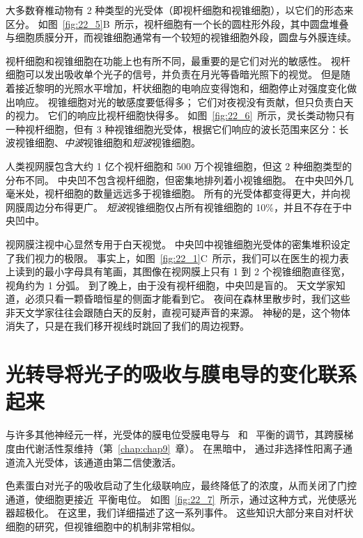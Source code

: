 大多数脊椎动物有 2 种类型的光受体（即视杆细胞和视锥细胞），以它们的形态来区分。
如图~\ref{fig:22_5}B~所示，视杆细胞有一个长的圆柱形外段，其中圆盘堆叠与细胞质膜分开，而视锥细胞通常有一个较短的视锥细胞外段，圆盘与外膜连续。


视杆细胞和视锥细胞在功能上也有所不同，最重要的是它们对光的敏感性。
视杆细胞可以发出吸收单个光子的信号，并负责在月光等昏暗光照下的视觉。
但是随着接近黎明的光照水平增加，杆状细胞的电响应变得饱和，细胞停止对强度变化做出响应。
视锥细胞对光的敏感度要低得多；
它们对夜视没有贡献，但只负责白天的视力。
它们的响应比视杆细胞快得多。
如图~\ref{fig:22_6}~所示，灵长类动物只有一种视杆细胞，但有 3 种视锥细胞光受体，根据它们响应的波长范围来区分：长波视锥细胞、\textit{中波}视锥细胞和\textit{短波}视锥细胞。


人类视网膜包含大约 1 亿个视杆细胞和 500 万个视锥细胞，但这 2 种细胞类型的分布不同。
中央凹不包含视杆细胞，但密集地排列着小视锥细胞。
在中央凹外几毫米处，视杆细胞的数量远远多于视锥细胞。
所有的光受体都变得更大，并向视网膜周边分布得更广。
\textit{短波}视锥细胞仅占所有视锥细胞的 10\%，并且不存在于中央凹中。


视网膜注视中心显然专用于白天视觉。
中央凹中视锥细胞光受体的密集堆积设定了我们视力的极限。
事实上，如图~\ref{fig:22_1}C~所示，我们可以在医生的视力表上读到的最小字母具有笔画，其图像在视网膜上只有 1 到 2 个视锥细胞直径宽，视角约为 1 分弧。
到了晚上，由于没有视杆细胞，中央凹是盲的。
天文学家知道，必须只看一颗昏暗恒星的侧面才能看到它。
夜间在森林里散步时，我们这些非天文学家往往会跟随白天的反射，直视可疑声音的来源。 
神秘的是，这个物体消失了，只是在我们移开视线时跳回了我们的周边视野。



\section{光转导将光子的吸收与膜电导的变化联系起来}

与许多其他神经元一样，光受体的膜电位受膜电导与~ 和~ 平衡的调节，其跨膜梯度由代谢活性泵维持（第~\ref{chap:chap9}~章）。
在黑暗中， 通过非选择性阳离子通道流入光受体，该通道由第二信使激活。


色素蛋白对光子的吸收启动了生化级联响应，最终降低了的浓度，从而关闭了门控通道，使细胞更接近~平衡电位。
如图~\ref{fig:22_7}~所示，通过这种方式，光使感光器超极化。
在这里，我们详细描述了这一系列事件。
这些知识大部分来自对杆状细胞的研究，但视锥细胞中的机制非常相似。


